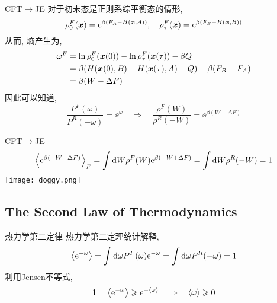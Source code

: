     \begin{frame}{CFT$\to$JE}
        对于初末态是正则系综平衡态的情形,
        \begin{equation}
            \rho^F_0(\vb*x) = \mathrm{e}^{\beta(F_A - H(\vb*x,A))},\quad \rho^F_\tau(\vb*x) = \mathrm{e}^{\beta(F_B - H(\vb*x,B))}
        \end{equation}
        从而, 熵产生为,
        \begin{equation}
            \begin{split}
                \omega^F &= \ln\rho^F_0(\vb*x(0)) - \ln\rho^F_\tau(\vb*x(\tau)) - \beta Q \\
                &=\beta(H(\vb*x(0),B) - H(\vb*x(\tau),A)-Q) - \beta(F_B-F_A) \\
                &= \beta(W-\Delta F)              
            \end{split}
        \end{equation}
        因此可以知道,
        \begin{equation}
            \frac{P^F(\omega)}{P^R(-\omega)} = \ee^{\omega}\quad\Rightarrow\quad \frac{\rho^F(W)}{\rho^R(-W)} = \ee^{\beta(W - \Delta F)}
        \end{equation}
    \end{frame}
    \begin{frame}{CFT$\to$JE}
        \begin{equation}
            \expval{\mathrm{e}^{\beta( - W + \Delta F)}}_F = \int\dd W\rho^F(W) \mathrm{e}^{\beta( - W + \Delta F)} = \int\dd W\rho^R(-W) = 1
        \end{equation}
        \pause
        \texttt{[image: doggy.png]}
    \end{frame}
    \subsection{The Second Law of Thermodynamics}
    \begin{frame}{热力学第二定律}
        热力学第二定理统计解释, 
        \begin{equation}
            \expval{\mathrm{e}^{-\omega}} = \int\dd \omega P^F(\omega) \mathrm{e}^{-\omega} = \int\dd \omega P^R(-\omega) = 1
        \end{equation}
        利用Jensen不等式,
        \begin{equation}
            1 = \expval{\mathrm{e}^{-\omega}} \geqslant \mathrm{e}^{-\expval{\omega}}\quad\Rightarrow\quad \expval{\omega} \geqslant 0
        \end{equation}
    \end{frame}


